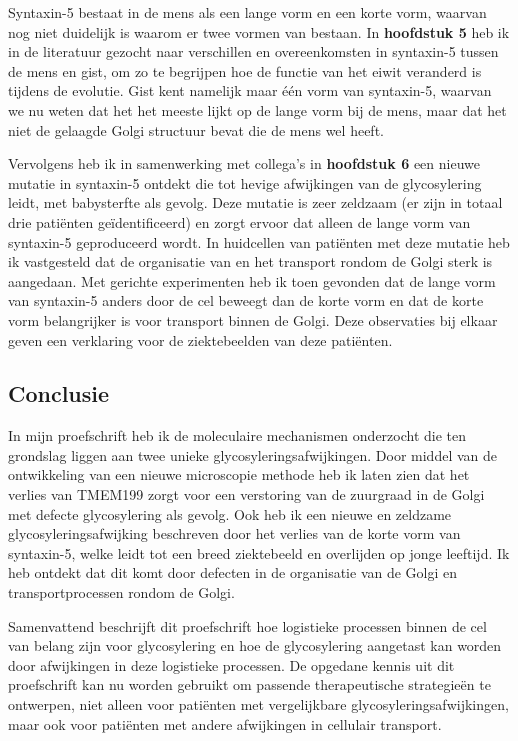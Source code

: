 Syntaxin-5 bestaat in de mens als een lange vorm en een korte vorm, waarvan nog niet duidelijk is waarom er twee vormen van bestaan. In \textbf{hoofdstuk 5} heb ik in de literatuur gezocht naar verschillen en overeenkomsten in syntaxin-5 tussen de mens en gist, om zo te begrijpen hoe de functie van het eiwit veranderd is tijdens de evolutie. Gist kent namelijk maar één vorm van syntaxin-5, waarvan we nu weten dat het het meeste lijkt op de lange vorm bij de mens, maar dat het niet de gelaagde Golgi structuur bevat die de mens wel heeft.

Vervolgens heb ik in samenwerking met collega’s in \textbf{hoofdstuk 6} een nieuwe mutatie in syntaxin-5 ontdekt die tot hevige afwijkingen van de glycosylering leidt, met babysterfte als gevolg. Deze mutatie is zeer zeldzaam (er zijn in totaal drie patiënten geïdentificeerd) en zorgt ervoor dat alleen de lange vorm van syntaxin-5 geproduceerd wordt. In huidcellen van patiënten met deze mutatie heb ik vastgesteld dat de organisatie van en het transport rondom de Golgi sterk is aangedaan. Met gerichte experimenten heb ik toen gevonden dat de lange vorm van syntaxin-5 anders door de cel beweegt dan de korte vorm en dat de korte vorm belangrijker is voor transport binnen de Golgi. Deze observaties bij elkaar geven een verklaring voor de ziektebeelden van deze patiënten.

\subsection{Conclusie}

In mijn proefschrift heb ik de moleculaire mechanismen onderzocht die ten grondslag liggen aan twee unieke glycosyleringsafwijkingen. Door middel van de ontwikkeling van een nieuwe microscopie methode heb ik laten zien dat het verlies van TMEM199 zorgt voor een verstoring van de zuurgraad in de Golgi met defecte glycosylering als gevolg. Ook heb ik een nieuwe en zeldzame glycosyleringsafwijking beschreven door het verlies van de korte vorm van syntaxin-5, welke leidt tot een breed ziektebeeld en overlijden op jonge leeftijd. Ik heb ontdekt dat dit komt door defecten in de organisatie van de Golgi en transportprocessen rondom de Golgi.

Samenvattend beschrijft dit proefschrift hoe logistieke processen binnen de cel van belang zijn voor glycosylering en hoe de glycosylering aangetast kan worden door afwijkingen in deze logistieke processen. De opgedane kennis uit dit proefschrift kan nu worden gebruikt om passende therapeutische strategieën te ontwerpen, niet alleen voor patiënten met vergelijkbare glycosyleringsafwijkingen, maar ook voor patiënten met andere afwijkingen in cellulair transport.

